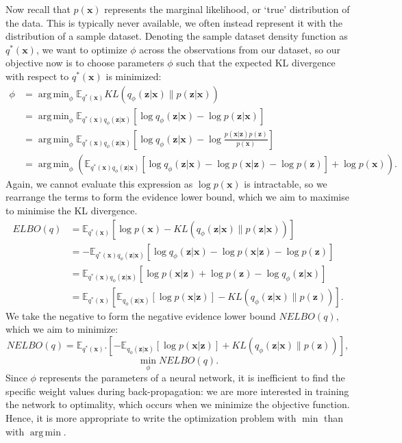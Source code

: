 \documentclass[honours,12pt]{unswthesis}
\newcommand{\E}{\mathbb{E}}
\DeclareMathOperator*{\argmin}{arg\,min}
\numberwithin{equation}{section}
\theoremstyle{definition}
\begin{document}
Now recall that $p(\bm{x})$ represents the marginal likelihood, or `true' distribution of the data. This is typically never available, we often instead represent it with the distribution of a sample dataset. Denoting the sample dataset density function as $q^*(\bm{x})$, we want to optimize $\phi$ across the observations from our dataset, so our objective now is to choose parameters $\phi$ such that the expected KL divergence with respect to $q^*(\bm{x})$ is minimized:
\begin{align*}
\phi &=\argmin_\phi \mathbb{E}_{q^*(\bm{x})}KL(q_\phi(\bm{z}|\bm{x})\|p(\bm{z}|\bm{x}))\\
&= \argmin_\phi \mathbb{E}_{q^*(\bm{x})q_\phi (\bm{z}|\bm{x})}\left[\log q_\phi(\bm{z}|\bm{x})-\log p(\bm{z}|\bm{x})\right]\\
&=\argmin_\phi\mathbb{E}_{q^*(\bm{x})q_\phi (\bm{z}|\bm{x})}\left[\log q_\phi(\bm{z}|\bm{x})-\log \frac{p(\bm{x}|\bm{z})p(\bm{z})}{p(\bm{x})}\right]\\
&=\argmin_\phi\left(\mathbb{E}_{q^*(\bm{x})q_\phi (\bm{z}|\bm{x})}\left[\log q_\phi(\bm{z}|\bm{x})-\log p(\bm{x}|\bm{z})-\log p(\bm{z})\right]+\log p(\bm{x})\right).
\end{align*} 
Again, we cannot evaluate this expression as $\log p(\bm{x})$ is intractable, so we rearrange the terms to form the evidence lower bound, which we aim to maximise to minimise the KL divergence.
\begin{align*}
ELBO(q)&=\mathbb{E}_{q^*(\bm{x})}[\log p(\bm{x})-KL(q_\phi(\bm{z}|\bm{x})\|p(\bm{z}|\bm{x}))]\\
&=-\mathbb{E}_{q^*(\bm{x})q_\phi(\bm{z}|\bm{x})}\left[\log q_\phi(\bm{z}|\bm{x})-\log p(\bm{x}|\bm{z})-\log p(\bm{z})\right]\\
&=\mathbb{E}_{q^*(\bm{x})q_\phi(\bm{z}|\bm{x})}\left[\log p(\bm{x}|\bm{z})+\log p(\bm{z})-\log q_\phi(\bm{z}|\bm{x})\right]\\
&=\mathbb{E}_{q^*(\bm{x})}\left[\E_{q_\phi(\bm{z}|\bm{x})}[\log p(\bm{x}|\bm{z})]-KL(q_\phi(\bm{z}|\bm{x})\|p(\bm{z}))\right].
\end{align*}
We take the negative to form the negative evidence lower bound $NELBO(q)$, which we aim to minimize:
\begin{equation*}
NELBO(q)=\mathbb{E}_{q^*(\bm{x})}.\left[-\E_{q_\phi(\bm{z}|\bm{x})}[\log p(\bm{x}|\bm{z})]+KL(q_\phi(\bm{z}|\bm{x})\|p(\bm{z}))\right],
\end{equation*}
\begin{equation}
\min_\phi NELBO(q).
\end{equation}
Since $\phi$ represents the parameters of a neural network, it is inefficient to find the specific weight values during back-propagation: we are more interested in training the network to optimality, which occurs when we minimize the objective function. Hence, it is more appropriate to write the optimization problem with $\min$ than with $\argmin$.
\end{document}
